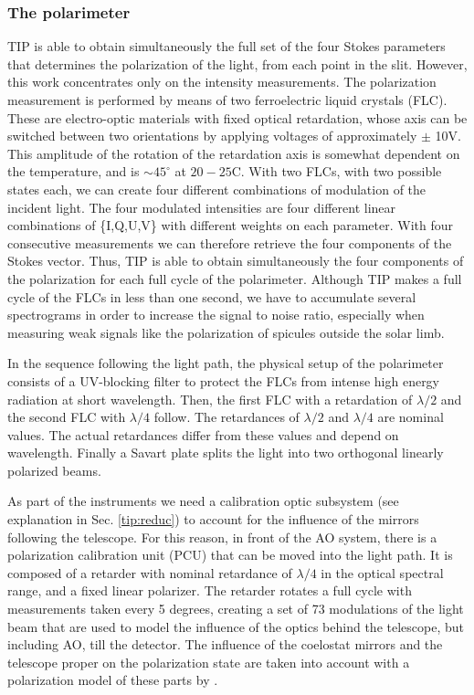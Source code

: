 \subsubsection*{The polarimeter\label{polarimeter}}
TIP is able to obtain simultaneously the full set of the four Stokes parameters that determines the polarization of the light, from each point in the slit. However, this work concentrates only on the intensity measurements. The polarization measurement is performed by means of two ferroelectric liquid crystals (FLC). These are electro-optic materials with fixed optical retardation, whose axis can be switched between two orientations by applying voltages of approximately $\pm$ 10V. This amplitude of the rotation of the retardation axis is somewhat dependent on the temperature, and is $\sim 45^{\circ}$ at $20-25$C. With two FLCs, with two possible states each, we can create four different combinations of modulation of the incident light. The four modulated intensities are four different linear combinations of \{I,Q,U,V\} with different weights on each parameter. With four consecutive measurements we can therefore retrieve the four components of the Stokes vector. Thus, TIP is able to obtain simultaneously the four components of the polarization for each full cycle of the polarimeter. Although TIP makes a full cycle of the FLCs in less than one second, we have to accumulate several spectrograms in order to increase the signal to noise ratio, especially when measuring weak signals like the polarization of spicules outside the solar limb.

In the sequence following the light path, the physical setup of the polarimeter consists of a UV-blocking filter to protect the FLCs from intense high energy radiation at short wavelength. Then, the first FLC with a retardation of $\lambda/2$ and the second FLC with $\lambda/4$ follow. The retardances of $\lambda/2$ and $\lambda/4$ are nominal values. The actual retardances differ from these values and depend on wavelength. Finally a Savart plate splits the light into two orthogonal linearly polarized beams.

As part of the instruments we need a calibration optic subsystem (see explanation in Sec.  \ref{tip:reduc}) to account for the influence of the mirrors following the telescope. For this reason, in front of the AO system, there is a polarization calibration unit (PCU) that can be moved into the light path. It is composed of a retarder with nominal retardance of $\lambda/4$ in the optical spectral range, and a fixed linear polarizer. The retarder rotates a full cycle with measurements taken every 5 degrees, creating a set of 73 modulations of the light beam that are used to model the influence of the optics behind the telescope, but including AO, till the detector. The influence of the coelostat mirrors and the telescope proper on the polarization state are taken into account with a polarization model of these parts by \cite{2005A&A...443.1047B}.


